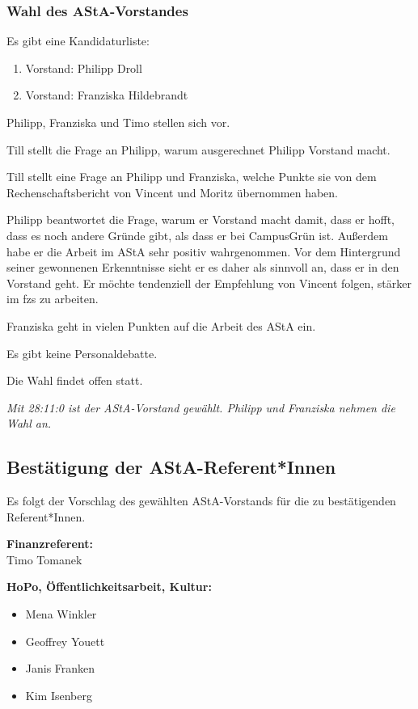 \documentclass[ngerman,headheight=70pt]{scrartcl}
\begin{document}
    \subsubsection{Wahl des AStA-Vorstandes}

    Es gibt eine Kandidaturliste:

    \begin{enumerate}
        \item Vorstand: Philipp Droll
        \item Vorstand: Franziska Hildebrandt
    \end{enumerate}

    Philipp, Franziska und Timo stellen sich vor.

    Till stellt die Frage an Philipp, warum ausgerechnet
    Philipp Vorstand macht.

    Till stellt eine Frage an Philipp und Franziska, welche Punkte sie
    von dem Rechenschaftsbericht von Vincent und Moritz übernommen haben.

    Philipp beantwortet die Frage, warum er Vorstand macht damit, dass
    er hofft, dass es noch andere Gründe gibt, als dass er bei CampusGrün ist.
    Außerdem habe er die Arbeit im AStA sehr positiv wahrgenommen. Vor dem
    Hintergrund seiner gewonnenen Erkenntnisse sieht er es daher als sinnvoll an,
    dass er in den Vorstand geht. Er möchte tendenziell der Empfehlung von Vincent
    folgen, stärker im fzs zu arbeiten.

    Franziska geht in vielen Punkten auf die Arbeit des AStA ein.

    Es gibt keine Personaldebatte.

    Die Wahl findet offen statt.

    \textit{Mit 28:11:0 ist der AStA-Vorstand gewählt. Philipp und Franziska nehmen
    die Wahl an.}

    \subsection{Bestätigung der AStA-Referent*Innen}

    Es folgt der Vorschlag des gewählten AStA-Vorstands für die zu bestätigenden
    Referent*Innen.

    \textbf{Finanzreferent:}\\
    Timo Tomanek

    \textbf{HoPo, Öffentlichkeitsarbeit, Kultur:}
    \begin{itemize}
        \item Mena Winkler
        \item Geoffrey Youett
        \item Janis Franken
        \item Kim Isenberg
    \end{itemize}
\end{document}
